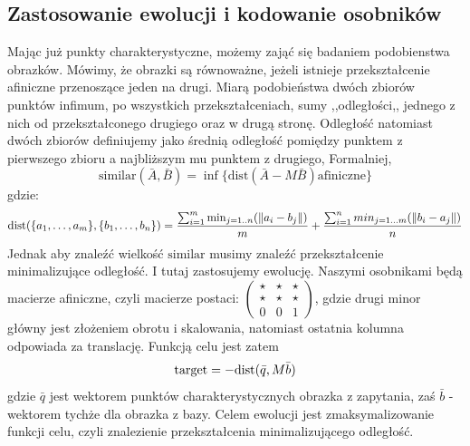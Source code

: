 \documentclass[a4paper,12pt,leqno]{article}
\begin{document}
\subsection{Zastosowanie ewolucji i kodowanie osobników}
Mając już punkty charakterystyczne, możemy zająć się badaniem podobienstwa obrazków. Mówimy, że obrazki są równoważne, jeżeli istnieje przekształcenie afiniczne 
przenoszące jeden na drugi. Miarą podobieństwa dwóch zbiorów punktów infimum, po wszystkich przekształceniach,
sumy ,,odległości,, jednego z nich od przekształconego drugiego oraz w drugą stronę. 
Odległość natomiast dwóch zbiorów definiujemy jako średnią odległość pomiędzy punktem z pierwszego zbioru a najbliższym mu punktem z drugiego, Formalniej,
\[
\mathrm{similar}(\bar{A}, \bar{B}) = \inf\{\textrm{dist}(\bar{A} - M\bar{B}) \text{afiniczne}\}
\]gdzie:
\[
\mathrm{dist}(\{a_1, \dots, a_m\}, \{b_1, \dots, b_n\}) = \frac{\sum_{i=1}^m \min_{j=1..n}(\|a_i - b_j\|)}{m} + \frac{\sum_{i=1}^n min_{j=1 \dots m}(\|b_i - a_j\|)}{n}
\]
Jednak aby znaleźć wielkość $\mathrm{similar}$ musimy znaleźć przekształcenie minimalizujące odległość. I tutaj zastosujemy ewolucję. 
Naszymi osobnikami będą macierze afiniczne, czyli macierze postaci:
$\begin{pmatrix}
\star & \star & \star \\
\star & \star & \star \\
0 & 0 & 1
\end{pmatrix}$, gdzie drugi minor główny jest złożeniem obrotu i skalowania, natomiast ostatnia kolumna odpowiada za translację.
Funkcją celu jest zatem 
\[
\mathrm{target} = -\mathrm{dist}(\bar{q}, M\bar{b})
\]
gdzie $\bar{q}$ jest wektorem punktów charakterystycznych obrazka z zapytania, zaś $\bar{b}$ - wektorem tychże dla obrazka z bazy.
Celem ewolucji jest zmaksymalizowanie funkcji celu, czyli znalezienie przekształcenia minimalizującego odległość.
\end{document}

